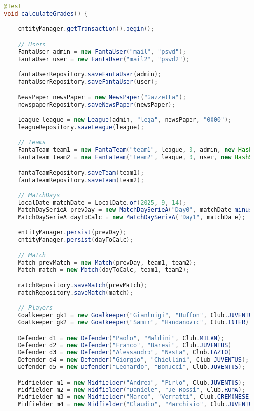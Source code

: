 \begin{lstlisting}[language=Java]
@Test
void calculateGrades() {

	entityManager.getTransaction().begin();

	// Users
	FantaUser admin = new FantaUser("mail", "pswd");
	FantaUser user = new FantaUser("mail2", "pswd2");

	fantaUserRepository.saveFantaUser(admin);
	fantaUserRepository.saveFantaUser(user);

	NewsPaper newsPaper = new NewsPaper("Gazzetta");
	newspaperRepository.saveNewsPaper(newsPaper);

	League league = new League(admin, "lega", newsPaper, "0000");
	leagueRepository.saveLeague(league);

	// Teams
	FantaTeam team1 = new FantaTeam("team1", league, 0, admin, new HashSet<Contract>());
	FantaTeam team2 = new FantaTeam("team2", league, 0, user, new HashSet<Contract>());

	fantaTeamRepository.saveTeam(team1);
	fantaTeamRepository.saveTeam(team2);

	// MatchDays
	LocalDate matchDate = LocalDate.of(2025, 9, 14);
	MatchDaySerieA prevDay = new MatchDaySerieA("Day0", matchDate.minusWeeks(1));
	MatchDaySerieA dayToCalc = new MatchDaySerieA("Day1", matchDate);

	entityManager.persist(prevDay);
	entityManager.persist(dayToCalc);

	// Match
	Match prevMatch = new Match(prevDay, team1, team2);
	Match match = new Match(dayToCalc, team1, team2);

	matchRepository.saveMatch(prevMatch);
	matchRepository.saveMatch(match);

	// Players
	Goalkeeper gk1 = new Goalkeeper("Gianluigi", "Buffon", Club.JUVENTUS);
	Goalkeeper gk2 = new Goalkeeper("Samir", "Handanovic", Club.INTER);

	Defender d1 = new Defender("Paolo", "Maldini", Club.MILAN);
	Defender d2 = new Defender("Franco", "Baresi", Club.JUVENTUS);
	Defender d3 = new Defender("Alessandro", "Nesta", Club.LAZIO);
	Defender d4 = new Defender("Giorgio", "Chiellini", Club.JUVENTUS);
	Defender d5 = new Defender("Leonardo", "Bonucci", Club.JUVENTUS);

	Midfielder m1 = new Midfielder("Andrea", "Pirlo", Club.JUVENTUS);
    Midfielder m2 = new Midfielder("Daniele", "De Rossi", Club.ROMA);
	Midfielder m3 = new Midfielder("Marco", "Verratti", Club.CREMONESE);
	Midfielder m4 = new Midfielder("Claudio", "Marchisio", Club.JUVENTUS);


\end{lstlisting}
